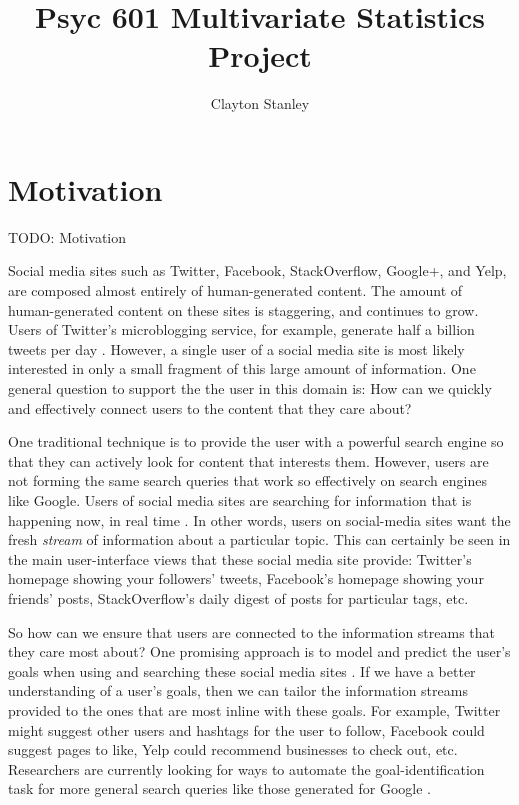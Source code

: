 \documentclass[man]{apa6}
\title{Psyc 601 Multivariate Statistics Project}
\author{Clayton Stanley}
\affiliation{Rice University}
\begin{document}
\maketitle

\tableofcontents
\newpage

\section{Motivation}

TODO: Motivation

Social media sites such as Twitter, Facebook, StackOverflow, Google+, and Yelp, are composed almost entirely of human-generated content.
The amount of human-generated content on these sites is staggering, and continues to grow.
Users of Twitter's microblogging service, for example, generate half a billion tweets per day \parencite{TwitterReport2012}.
However, a single user of a social media site is most likely interested in only a small fragment of this large amount of information.
One general question to support the the user in this domain is:
How can we quickly and effectively connect users to the content that they care about?

One traditional technique is to provide the user with a powerful search engine so that they can actively look for content that interests them.
However, users are not forming the same search queries that work so effectively on search engines like Google.
Users of social media sites are searching for information that is happening now, in real time \parencite{Bauer2012}.
In other words, users on social-media sites want the fresh \emph{stream} of information about a particular topic.
This can certainly be seen in the main user-interface views that these social media site provide:
Twitter's homepage showing your followers' tweets, Facebook's homepage showing your friends' posts, StackOverflow's daily digest of posts for particular tags, etc.

So how can we ensure that users are connected to the information streams that they care most about?
One promising approach is to model and predict the user's goals when using and searching these social media sites \parencite{Rose2004}.
If we have a better understanding of a user's goals, then we can tailor the information streams provided to the ones that are most inline with these goals.
For example, Twitter might suggest other users and hashtags for the user to follow, Facebook could suggest pages to like, Yelp could recommend businesses to check out, etc.
Researchers are currently looking for ways to automate the goal-identification task for more general search queries like those generated for Google \parencites{Jansen2008}{Lee2005}.
\end{document}
